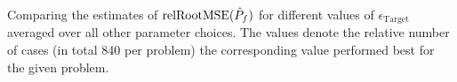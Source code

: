 Comparing the estimates of $\textup{relRootMSE}(\hat{P}_f)$ for different values of $\epsilon_{\text{Target}}$ averaged over  all other parameter choices. The values denote the relative number of cases (in total 840 per problem) the corresponding value performed best for the given problem.